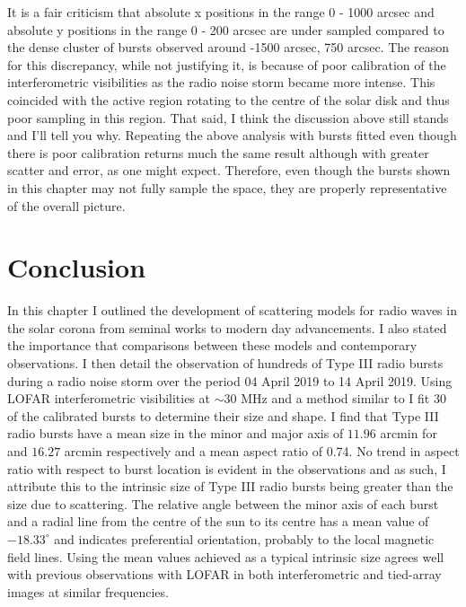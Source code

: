 It is a fair criticism that absolute x positions in the range 0 - 1000 arcsec and absolute y positions in the range 0 - 200 arcsec are under sampled compared to the dense cluster of bursts observed around -1500 arcsec, 750 arcsec. The reason for this discrepancy, while not justifying it, is because of poor calibration of the interferometric visibilities as the radio noise storm became more intense. This coincided with the active region rotating to the centre of the solar disk and thus poor sampling in this region. That said, I think the discussion above still stands and I'll tell you why. Repeating the above analysis with bursts fitted even though there is poor calibration returns much the same result although with greater scatter and error, as one might expect. Therefore, even though the bursts shown in this chapter may not fully sample the space, they are properly representative of the overall picture.

\section{Conclusion}
In this chapter I outlined the development of scattering models for radio waves in the solar corona from seminal works to modern day advancements. I also stated the importance that comparisons between these models and contemporary observations. I then detail the observation of hundreds of Type III radio bursts during a radio noise storm over the period 04 April 2019 to 14 April 2019. Using LOFAR interferometric visibilities at $\sim 30$ MHz and a method similar to \cite{Murphy2021} I fit 30 of the calibrated bursts to determine their size and shape. I find that Type III radio bursts have a mean size in the minor and major axis of $11.96$ arcmin for and $16.27$ arcmin respectively and a mean aspect ratio of 0.74. No trend in aspect ratio with respect to burst location is evident in the observations and as such, I attribute this to the intrinsic size of Type III radio bursts being greater than the size due to scattering. The relative angle between the minor axis of each burst and a radial line from the centre of the sun to its centre has a mean value of $-18.33^\circ$ and indicates preferential orientation, probably to the local magnetic field lines. Using the mean values achieved as a typical intrinsic size agrees well with previous observations with LOFAR in both interferometric and tied-array images at similar frequencies.

